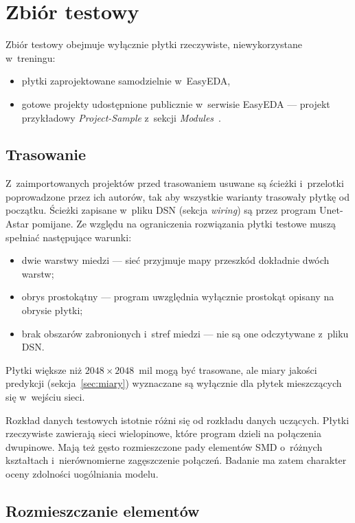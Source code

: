 \section{Zbiór testowy}
\label{sec:zbior-testowy}

Zbiór testowy obejmuje wyłącznie płytki rzeczywiste, niewykorzystane
w~treningu:
\begin{itemize}
  \item płytki zaprojektowane samodzielnie w~EasyEDA,
  \item gotowe projekty udostępnione publicznie w~serwisie EasyEDA ---
    projekt przykładowy \emph{Project-Sample} z~sekcji
    \emph{Modules}~\cite{EasyEDA_ProjectSample}.
\end{itemize}

\subsection{Trasowanie}
\label{sec:zbior-testowy-trasowanie}

Z~zaimportowanych projektów przed trasowaniem usuwane są ścieżki
i~przelotki poprowadzone przez ich autorów, tak aby wszystkie warianty
trasowały płytkę od początku. Ścieżki zapisane w~pliku DSN (sekcja
\emph{wiring}) są przez program Unet-Astar pomijane.
Ze względu na ograniczenia rozwiązania płytki testowe muszą spełniać
następujące warunki:
\begin{itemize}
  \item dwie warstwy miedzi --- sieć przyjmuje mapy przeszkód dokładnie
    dwóch warstw;
  \item obrys prostokątny --- program uwzględnia wyłącznie prostokąt
    opisany na obrysie płytki;
  \item brak obszarów zabronionych i~stref miedzi --- nie są one
    odczytywane z~pliku DSN.
\end{itemize}
Płytki większe niż $2048 \times 2048$~mil mogą być trasowane, ale miary
jakości predykcji (sekcja~\ref{sec:miary}) wyznaczane są wyłącznie dla
płytek mieszczących się w~wejściu sieci.

Rozkład danych testowych istotnie różni się od rozkładu danych uczących.
Płytki rzeczywiste zawierają sieci wielopinowe, które program dzieli na
połączenia dwupinowe. Mają też gęsto rozmieszczone pady elementów SMD
o~różnych kształtach i~nierównomierne zagęszczenie połączeń. Badanie
ma zatem charakter oceny zdolności uogólniania modelu.

\subsection{Rozmieszczanie elementów}
\label{sec:zbior-testowy-rozmieszczanie}

